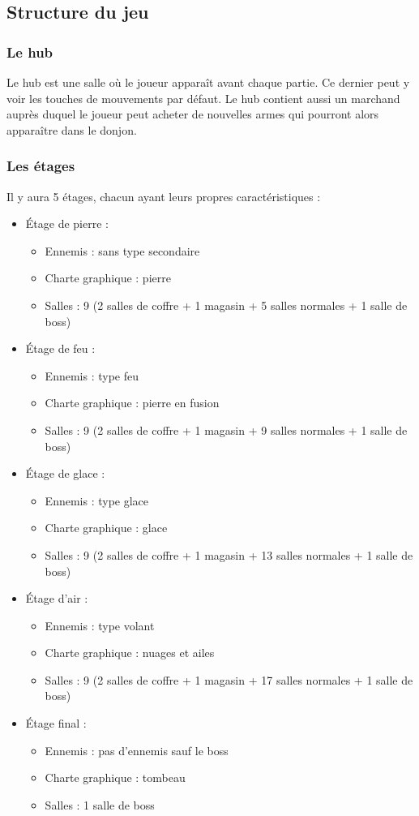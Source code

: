\documentclass[]{extarticle}
\begin{document}
	\subsection{Structure du jeu}
		\subsubsection{Le hub}
\bigbreak
\bigbreak
Le hub est une salle où le joueur apparaît avant chaque partie. Ce dernier peut y voir les touches de mouvements par défaut. Le hub contient aussi un marchand auprès duquel le joueur peut acheter de nouvelles armes qui pourront alors apparaître dans le donjon.
\bigbreak

		\subsubsection{Les étages}
\bigbreak
\bigbreak
Il y aura 5 étages, chacun ayant leurs propres caractéristiques :
\bigbreak
\begin{itemize}
\item Étage de pierre :
\begin{itemize}
\item Ennemis : sans type secondaire
\item Charte graphique : pierre
\item Salles : 9 (2 salles de coffre + 1 magasin + 5 salles normales + 1 salle de boss)
\end{itemize}
\bigbreak
\item Étage de feu :
\begin{itemize}
\item Ennemis : type feu
\item Charte graphique : pierre en fusion
\item Salles : 9 (2 salles de coffre + 1 magasin + 9 salles normales + 1 salle de boss)
\end{itemize}
\bigbreak
\item Étage de glace :
\begin{itemize}
\item Ennemis : type glace
\item Charte graphique : glace
\item Salles : 9 (2 salles de coffre + 1 magasin + 13 salles normales + 1 salle de boss)
\end{itemize}
\bigbreak
\item Étage d’air :
\begin{itemize}
\item Ennemis : type volant
\item Charte graphique : nuages et ailes
\item Salles : 9 (2 salles de coffre + 1 magasin + 17 salles normales + 1 salle de boss)
\end{itemize}
\bigbreak
\item Étage final :
\begin{itemize}
\item Ennemis : pas d’ennemis sauf le boss
\item Charte graphique : tombeau
\item Salles : 1 salle de boss
\end{itemize}
\end{itemize}
\end{document}
